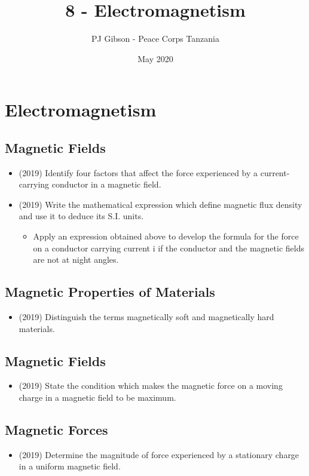 \documentclass{article}
\title{8 - Electromagnetism}
\author{PJ Gibson - Peace Corps Tanzania}
\date{May 2020}
\begin{document}
\maketitle


\section{Electromagnetism}

\subsection{Magnetic Fields}
\begin{itemize}
\item (2019)  Identify four factors that affect the force experienced by a current-carrying conductor in a magnetic field. 
\item (2019)  Write the mathematical expression which define magnetic flux density and use it to deduce its S.I. units. 
 \begin{itemize}
\item Apply an expression obtained above to develop the formula for the force on a conductor carrying current i if the conductor and the magnetic fields are not at night angles.
\end{itemize}
\end{itemize}

\subsection{Magnetic Properties of Materials}
\begin{itemize}
\item (2019)  Distinguish the terms magnetically soft and magnetically hard materials.
\end{itemize}

\subsection{Magnetic Fields}
\begin{itemize}
\item (2019)  State the condition which makes the magnetic force on a moving charge in a magnetic field to be maximum. 
\end{itemize}

\subsection{Magnetic Forces}
\begin{itemize}
\item (2019)  Determine the magnitude of force experienced by a stationary charge in a uniform magnetic field. 
\end{itemize}
\end{document}
